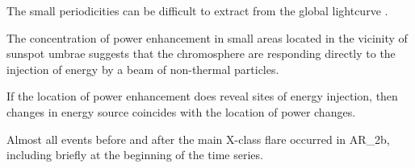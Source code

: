 The small periodicities can be difficult to extract from the global
lightcurve \citep{VanDoorsselaere2016}.

The concentration of power enhancement in small areas
located in the vicinity of sunspot umbrae suggests that
 the chromosphere
are responding directly to the injection of energy by
a beam of non-thermal particles.

If the location of power enhancement does reveal sites of energy injection,
then  changes in energy source coincides
with the location of power changes.



Almost all events before and after the main X-class flare
occurred in AR\_2b, including briefly at the beginning of the time series.
